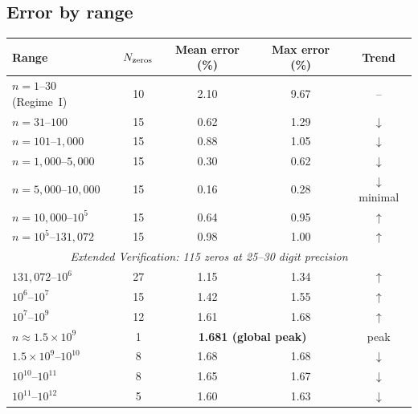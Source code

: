 \subsection{Error by range}\label{ssec:error-range}

\begin{center}
\begin{tabular}{lcccc}
\toprule
Range & $N_{\rm zeros}$ & Mean error (\%) & Max error (\%) & Trend \\
\midrule
$n = 1$--$30$ (Regime~I)         & 10  & 2.10  & 9.67  & -- \\
$n = 31$--$100$                  & 15  & 0.62  & 1.29  & $\downarrow$ \\
$n = 101$--$1{,}000$             & 15  & 0.88  & 1.05  & $\downarrow$ \\
$n = 1{,}000$--$5{,}000$         & 15  & 0.30  & 0.62  & $\downarrow$ \\
$n = 5{,}000$--$10{,}000$        & 15  & 0.16  & 0.28  & $\downarrow$ minimal \\
$n = 10{,}000$--$10^5$           & 15  & 0.64  & 0.95  & $\uparrow$ \\
$n = 10^5$--$131{,}072$          & 15  & 0.98  & 1.00  & $\uparrow$ \\
\midrule
\multicolumn{5}{c}{\emph{Extended Verification: 115 zeros at 25--30 digit precision}} \\
$131{,}072$--$10^6$              & 27  & 1.15  & 1.34  & $\uparrow$ \\
$10^6$--$10^7$                   & 15  & 1.42  & 1.55  & $\uparrow$ \\
$10^7$--$10^9$                   & 12  & 1.61  & 1.68  & $\uparrow$ \\
$n \approx 1.5 \times 10^9$      & 1   & \multicolumn{2}{c}{\textbf{1.681 (global peak)}} & peak \\
$1.5\times 10^9$--$10^{10}$      & 8   & 1.68  & 1.68  & $\downarrow$ \\
$10^{10}$--$10^{11}$             & 8   & 1.65  & 1.67  & $\downarrow$ \\
$10^{11}$--$10^{12}$             & 5   & 1.60  & 1.63  & $\downarrow$ \\
\bottomrule
\end{tabular}
\end{center}


